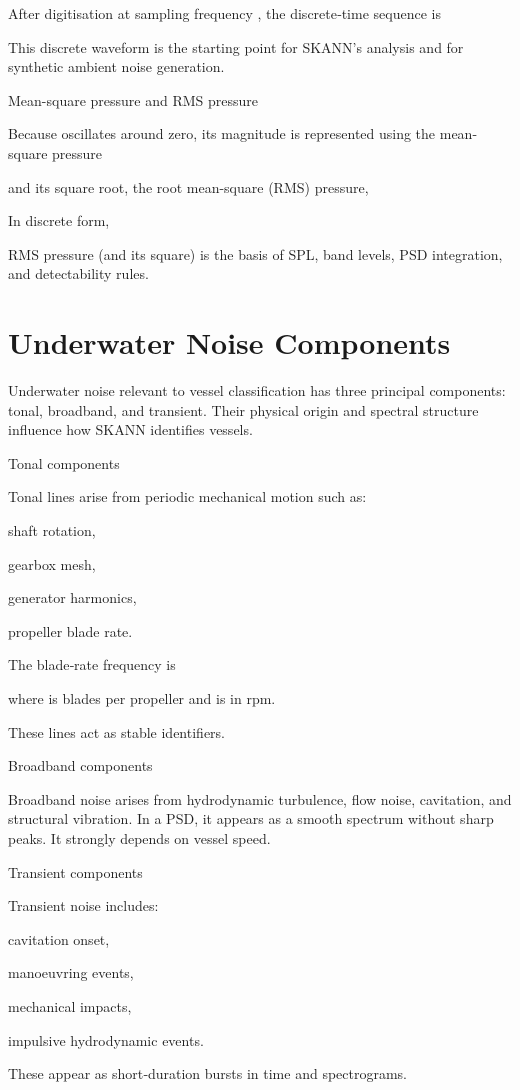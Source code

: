 \documentclass[12pt]{article}
\begin{document}
After digitisation at sampling frequency , the discrete‐time sequence is


This discrete waveform is the starting point for SKANN’s analysis and for synthetic ambient noise generation.

Mean-square pressure and RMS pressure

Because  oscillates around zero, its magnitude is represented using the mean-square pressure


and its square root, the root mean-square (RMS) pressure,


In discrete form,


RMS pressure (and its square) is the basis of SPL, band levels, PSD integration, and detectability rules.

\section*{Underwater Noise Components}
Underwater noise relevant to vessel classification has three principal components: tonal, broadband, and transient. Their physical origin and spectral structure influence how SKANN identifies vessels.

Tonal components

Tonal lines arise from periodic mechanical motion such as:

shaft rotation,

gearbox mesh,

generator harmonics,

propeller blade rate.

The blade‐rate frequency is


where  is blades per propeller and  is in rpm.

These lines act as stable identifiers.

Broadband components

Broadband noise arises from hydrodynamic turbulence, flow noise, cavitation, and structural vibration. In a PSD, it appears as a smooth spectrum without sharp peaks. It strongly depends on vessel speed.

Transient components

Transient noise includes:

cavitation onset,

manoeuvring events,

mechanical impacts,

impulsive hydrodynamic events.

These appear as short‐duration bursts in time and spectrograms.
\end{document}
